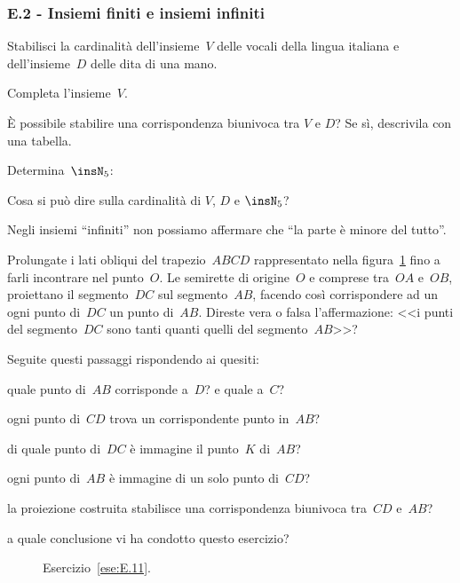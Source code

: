 \subsubsection*{E.2 - Insiemi finiti e insiemi infiniti}

\begin{esercizio}
\label{ese:E.10}
Stabilisci la cardinalità dell'insieme~$V$ delle vocali della lingua italiana e dell'insieme~$D$ delle dita di una mano.

Completa l'insieme~$V$.

\`E possibile stabilire una corrispondenza biunivoca tra $V$ e $D$? Se sì, descrivila con una tabella.

Determina~$\insN_{5}$: \dotfill

Cosa si può dire sulla cardinalità di $V$, $D$ e $\insN_5$?
\end{esercizio}

\begin{esercizio}
\label{ese:E.11}
Negli insiemi ``infiniti'' non possiamo affermare che ``la parte è minore del tutto''.

Prolungate i lati obliqui
del trapezio~${ABCD}$ rappresentato nella figura~\ref{fig:E.12} fino a farli incontrare nel punto~$O$.
Le semirette di origine~$O$ e comprese tra~${OA}$ e~${OB}$, proiettano il segmento~${DC}$ sul segmento~${AB}$,
facendo così corrispondere ad un ogni punto di~${DC}$ un punto di~${AB}$.
Direste vera o falsa l'affermazione: <<i punti del segmento~${DC}$ sono tanti quanti quelli del segmento~${AB}$>>?

Seguite questi passaggi rispondendo ai quesiti:
\begin{enumeratea}
 \item quale punto di~$AB$ corrisponde a~$D$? e quale a~$C$?
 \item ogni punto di~${CD}$ trova un corrispondente punto in~${AB}$?
 \item di quale punto di~$DC$ è immagine il punto~$K$ di~${AB}$?
 \item ogni punto di~${AB}$ è immagine di un solo punto di~${CD}$?
 \item la proiezione costruita stabilisce una corrispondenza biunivoca tra~${CD}$ e~${AB}$?
 \item a quale conclusione vi ha condotto questo esercizio?
\end{enumeratea}
\end{esercizio}
\begin{figure}[htb]
  \centering
 \caption{Esercizio~\ref{ese:E.11}.}\label{fig:E.12}
\end{figure}


